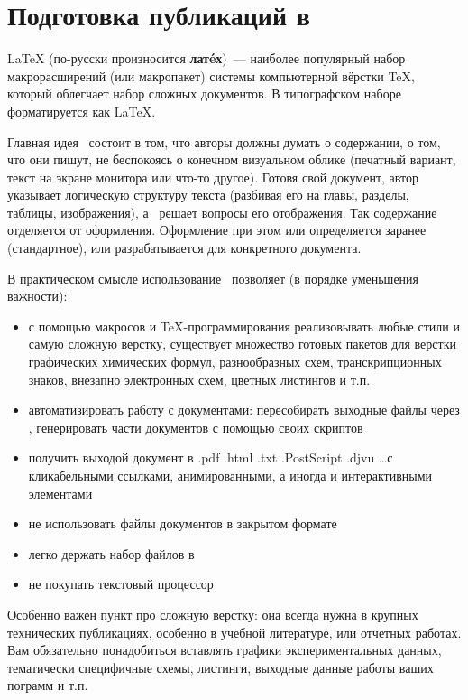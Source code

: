 \part{Подготовка публикаций в \latex}


LaTeX (по-русски произносится \textbf{лат\'eх})\ --- наиболее популярный набор
макрорасширений (или макропакет) системы компьютерной вёрстки \TeX, который
облегчает набор сложных документов. В типографском наборе форматируется как
\LaTeX.

Главная идея \latex\ состоит в том, что авторы должны думать о содержании, о
том, что они пишут, не беспокоясь о конечном визуальном облике (печатный
вариант, текст на экране монитора или что-то другое). Готовя свой документ,
автор указывает логическую структуру текста (разбивая его на главы, разделы,
таблицы, изображения), а \latex\ решает вопросы его отображения. Так содержание
отделяется от оформления. Оформление при этом или определяется заранее
(стандартное), или разрабатывается для конкретного документа.

В практическом смысле использование \latex\ позволяет (в порядке уменьшения
важности):
\begin{itemize}
  \item с помощью макросов и \TeX-программирования реализовывать любые стили и
  самую сложную верстку, существует множество готовых пакетов для верстки
  графических химических формул, разнообразных схем, транскрипционных знаков,
  внезапно электронных схем, цветных листингов и т.п. 
  \item автоматизировать работу с документами: пересобирать выходные файлы через
  \make, генерировать части документов с помощью своих скриптов
  \item получить выходой документ в .pdf .html .txt .PostScript .djvu \ldots с
  кликабельными ссылками, анимированными, а иногда и интерактивными элементами
  \item не использовать файлы документов в закрытом формате
  \item легко держать набор файлов в \vcs
  \item не покупать текстовый процессор
\end{itemize}

Особенно важен пункт про сложную верстку: она всегда нужна в крупных технических
публикациях, особенно в учебной литературе, или отчетных работах. Вам
обязательно понадобиться вставлять графики экспериментальных данных, тематически
специфичные схемы, листинги, выходные данные работы ваших пограмм и т.п.

